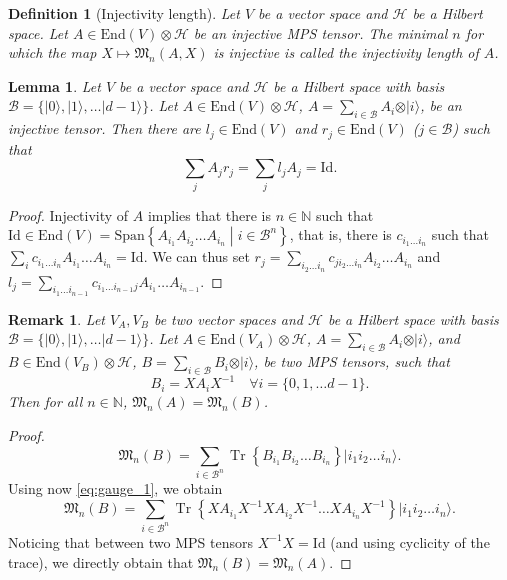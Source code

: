 \documentclass{article}
\newtheorem{lemma}{Lemma}
\newtheorem{remark}{Remark}
\newtheorem{definition}{Definition}
\newcommand{\tr}{\operatorname{Tr}}
\newcommand{\id}{\mathrm{Id}}
\newcommand{\End}{\mathrm{End}}
\newcommand{\ket}[1]{\vert #1 \rangle}
\newcommand{\Span}{\mathrm{Span}}
\begin{document}
\begin{definition}[Injectivity length]
    Let $V$ be a vector space and $\mathcal{H}$ be a Hilbert space. Let $A\in \End(V)\otimes \mathcal{H}$ be an \emph{injective} MPS tensor. The minimal $n$ for which the map $X\mapsto \mathfrak{M}_n(A,X)$ is injective is called the \emph{injectivity length} of $A$.
\end{definition}

\begin{lemma}\label{lem:injective_l_r_inverse}
  Let $V$ be a vector space and $\mathcal{H}$ be a Hilbert space with basis $\mathcal{B} = \{\ket{0},\ket{1},\dots \ket{d-1}\}$. Let $A\in \End(V)\otimes \mathcal{H}$, $A = \sum_{i\in \mathcal{B}} A_i \otimes \ket{i}$, be an injective tensor. Then there are $l_j\in \End(V)$ and $r_j \in \End(V)$ ($j\in\mathcal{B}$) such that
  \begin{equation*}
    \sum_j A_j r_j = \sum_j l_j A_j = \id.
  \end{equation*} 
\end{lemma}
\begin{proof}
  Injectivity of $A$ implies that there is $n\in\mathbb{N}$ such that $\id\in\End(V) = \Span\left\{A_{i_1} A_{i_2} \dots A_{i_n} \middle| i\in \mathcal{B}^n \right\}$, that is, there is  $c_{i_1\dots i_n}$ such that $\sum_i c_{i_1 \dots i_n} A_{i_1}\dots A_{i_n} = \id$. We can thus set $r_j = \sum_{i_2 \dots i_n} c_{ji_2\dots i_n} A_{i_2}\dots A_{i_n}$ and $l_j = \sum_{i_1 \dots i_{n-1}} c_{i_1\dots i_{n-1}j} A_{i_1}\dots A_{i_{n-1}}$. 
\end{proof}



\begin{remark}
  Let $V_A, V_B$ be two vector spaces and $\mathcal{H}$ be a Hilbert space with basis $\mathcal{B} = \{\ket{0},\ket{1},\dots \ket{d-1}\}$. Let $A\in \End(V_A)\otimes \mathcal{H}$, $A = \sum_{i\in \mathcal{B}} A_i \otimes \ket{i}$, and $B\in \End(V_B)\otimes \mathcal{H}$, $B = \sum_{i\in \mathcal{B}} B_i \otimes \ket{i}$, be two MPS tensors, such that 
  \begin{equation}\label{eq:gauge_1}
    B_i = X A_i X^{-1} \quad \forall i = \{0,1,\dots d-1\}.
  \end{equation}
  Then for all $n\in\mathbb{N}$, $\mathfrak{M}_n(A) = \mathfrak{M}_n(B)$.
\end{remark}

\begin{proof}
  \begin{equation*}
    \mathfrak{M}_n(B) = \sum_{i\in \mathcal{B}^n} \tr\left\{B_{i_1} B_{i_2} \dots B_{i_n}\right\} \ket{i_1 i_2 \dots i_n}.
  \end{equation*}
  Using now \cref{eq:gauge_1}, we obtain   
  \begin{equation*}
    \mathfrak{M}_n(B) = \sum_{i\in \mathcal{B}^n} \tr\left\{XA_{i_1}X^{-1} XA_{i_2}X^{-1} \dots XA_{i_n}X^{-1}\right\} \ket{i_1 i_2 \dots i_n}.
  \end{equation*}
  Noticing that between two MPS tensors $X^{-1}X=\id$ (and using cyclicity of the trace), we directly obtain  that $\mathfrak{M}_n(B) = \mathfrak{M}_n(A)$.
\end{proof}
\end{document}
